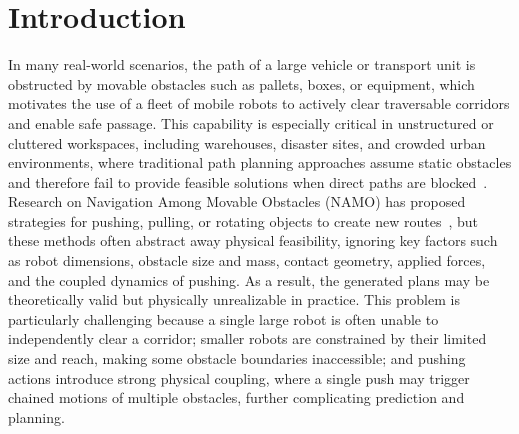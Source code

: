 \section{Introduction}\label{sec:intro}
In many real-world scenarios, the path of a large vehicle or transport unit is obstructed by
movable obstacles such as pallets, boxes, or equipment, which motivates the use of a fleet of
mobile robots to actively clear traversable corridors and enable safe passage. This capability
is especially critical in unstructured or cluttered workspaces, including warehouses, disaster
sites, and crowded urban environments, where traditional path planning approaches assume
static obstacles and therefore fail to provide feasible solutions when direct paths are
blocked~\cite{liu2023path}. Research on Navigation Among Movable Obstacles (NAMO) has proposed strategies
for pushing, pulling, or rotating objects to create new routes~\cite{stilman2005navigation}, but these methods often
abstract away physical feasibility, ignoring key factors such as robot dimensions, obstacle
size and mass, contact geometry, applied forces, and the coupled dynamics of pushing. As a
result, the generated plans may be theoretically valid but physically unrealizable in practice.
This problem is particularly challenging because a single large robot is often unable to
independently clear a corridor; smaller robots are constrained by their limited size and reach,
making some obstacle boundaries inaccessible; and pushing actions introduce strong physical
coupling, where a single push may trigger chained motions of multiple obstacles, further
complicating prediction and planning.



